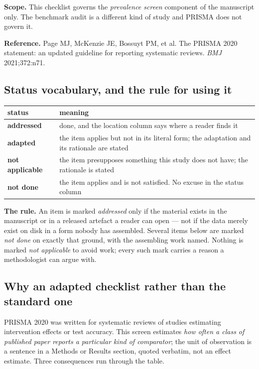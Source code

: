 \documentclass[11pt,a4paper]{article}
\begin{document}
\textbf{Scope.} This checklist governs the \emph{prevalence screen} component of the
manuscript only. The benchmark audit is a different kind of study and PRISMA does not
govern it.

\textbf{Reference.} Page MJ, McKenzie JE, Bossuyt PM, et al. The PRISMA 2020
statement: an updated guideline for reporting systematic reviews. \emph{BMJ}
2021;372:n71.

\subsection{Status vocabulary, and the rule for using it}

\begin{table}[htbp]
\centering
\small
\begin{tabular}{@{}lL{11.4cm}@{}}
\toprule
status & meaning \\
\midrule
\textbf{addressed} & done, and the location column says where a reader finds it \\
\textbf{adapted} & the item applies but not in its literal form; the adaptation and its rationale are stated \\
\textbf{not applicable} & the item presupposes something this study does not have; the rationale is stated \\
\textbf{not done} & the item applies and is not satisfied. No excuse in the status column \\
\bottomrule
\end{tabular}
\end{table}

\textbf{The rule.} An item is marked \emph{addressed} only if the material exists in
the manuscript or in a released artefact a reader can open --- not if the data merely
exist on disk in a form nobody has assembled. Several items below are marked
\emph{not done} on exactly that ground, with the assembling work named. Nothing is
marked \emph{not applicable} to avoid work; every such mark carries a reason a
methodologist can argue with.

\subsection{Why an adapted checklist rather than the standard one}

PRISMA 2020 was written for systematic reviews of studies estimating intervention
effects or test accuracy. This screen estimates \emph{how often a class of published
paper reports a particular kind of comparator}; the unit of observation is a sentence
in a Methods or Results section, quoted verbatim, not an effect estimate. Three
consequences run through the table.
\end{document}
